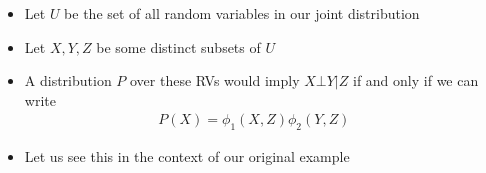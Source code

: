 \begin{frame}
\end{frame}

\begin{frame}
	\begin{columns}
		\begin{overlayarea}{\textwidth}{\textheight}
		\end{overlayarea}
		\begin{overlayarea}{\textwidth}{\textheight}
			\begin{itemize}[<+->]\justifying
				\item Let $U$ be the set of all random variables in our joint distribution 
				\item Let $X,Y,Z$ be some distinct subsets of $U$
				\item A distribution $P$ over these RVs would imply $X\bot Y|Z$ if and only if we can write 
				\begin{align*}
				P(X) = \phi_1(X,Z)\phi_2(Y,Z)
				\end{align*}
				\item Let us see this in the context of our original example
			\end{itemize}
		\end{overlayarea}
	\end{columns}
\end{frame}

